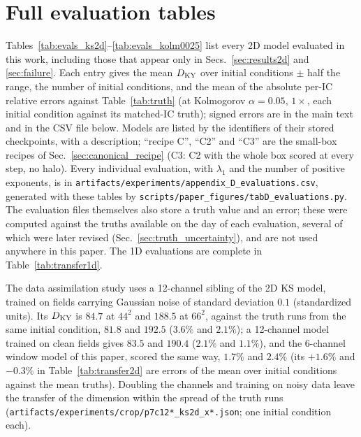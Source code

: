 \section{Full evaluation tables}
\label{app:tables}

Tables~\ref{tab:evals_ks2d}--\ref{tab:evals_kolm0025} list every 2D model
evaluated in this work, including those that appear only in
Secs.~\ref{sec:results2d} and \ref{sec:failure}. Each entry gives the mean
$D_{\mathrm{KY}}$ over initial conditions $\pm$ half the range, the number of
initial conditions, and the mean of the absolute per-IC relative errors
against Table~\ref{tab:truth} (at Kolmogorov $\alpha=0.05$, $1\times$, each
initial condition against its matched-IC truth); signed errors are in the
main text and in the CSV file below. Models are listed by the identifiers
of their stored checkpoints, with a description; ``recipe C'', ``C2'' and
``C3'' are the small-box recipes of Sec.~\ref{sec:canonical_recipe} (C3:
C2 with the whole box scored at every step, no halo). Every individual evaluation,
with $\lambda_1$ and the number of positive exponents, is in
\texttt{artifacts/\allowbreak experiments/\allowbreak appendix\_D\_evaluations.csv}, generated with
these tables by \texttt{scripts/paper\_figures/tabD\_evaluations.py}. The
evaluation files themselves also store a truth value and an error; these
were computed against the truths available on the day of each
evaluation, several of which were later revised (Sec.~\ref{sec:truth_uncertainty}),
and are not used anywhere in this paper. The 1D evaluations are complete
in Table~\ref{tab:transfer1d}.

 The data assimilation study
\citep{jones2026da} uses a 12-channel sibling of the 2D KS model, trained on fields carrying
Gaussian noise of standard deviation $0.1$ (standardized units). Its $D_{\mathrm{KY}}$ is $84.7$ at
$44^2$ and $188.5$ at $66^2$, against the truth runs from the same initial condition, $81.8$ and $192.5$
($3.6\%$ and $2.1\%$); a 12-channel model trained on clean fields gives $83.5$ and $190.4$ ($2.1\%$ and
$1.1\%$), and the 6-channel window model of this paper, scored the same way, $1.7\%$ and $2.4\%$ (its $+1.6\%$ and
$-0.3\%$ in Table~\ref{tab:transfer2d} are errors of the mean over initial conditions against the mean truths). Doubling the channels and training on noisy data leave the transfer of the dimension
within the spread of the truth runs (\texttt{artifacts/experiments/crop/p7c12*\_ks2d\_x*.json}; one
initial condition each).

